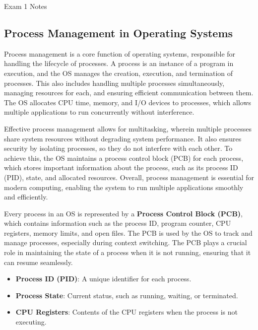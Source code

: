 \begin{examnotes}{Exam 1 Notes}
    \subsection*{Process Management in Operating Systems}

    Process management is a core function of operating systems, responsible for handling the lifecycle of processes. A process is an instance of a program in execution, and the OS manages the creation, 
    execution, and termination of processes. This also includes handling multiple processes simultaneously, managing resources for each, and ensuring efficient communication between them. The OS allocates 
    CPU time, memory, and I/O devices to processes, which allows multiple applications to run concurrently without interference.
    
    Effective process management allows for multitasking, wherein multiple processes share system resources without degrading system performance. It also ensures security by isolating processes, so 
    they do not interfere with each other. To achieve this, the OS maintains a process control block (PCB) for each process, which stores important information about the process, such as its process 
    ID (PID), state, and allocated resources. Overall, process management is essential for modern computing, enabling the system to run multiple applications smoothly and efficiently.
    
    \begin{highlight}
        Every process in an OS is represented by a \textbf{Process Control Block (PCB)}, which contains information such as the process ID, program counter, CPU registers, memory limits, and open files. 
        The PCB is used by the OS to track and manage processes, especially during context switching. The PCB plays a crucial role in maintaining the state of a process when it is not running, ensuring 
        that it can resume seamlessly.
        \begin{itemize}
            \item \textbf{Process ID (PID)}: A unique identifier for each process.
            \item \textbf{Process State}: Current status, such as running, waiting, or terminated.
            \item \textbf{CPU Registers}: Contents of the CPU registers when the process is not executing.
        \end{itemize}
    \end{highlight}
    

\end{examnotes}
